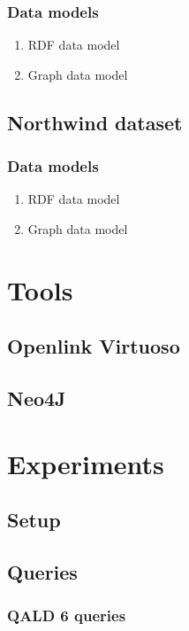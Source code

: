 \documentclass{sig-alternate-05-2015}
\begin{document}
\subsubsection{Data models}
\begin{enumerate}
    \item RDF data model
    \item Graph data model
\end{enumerate}

\subsection{Northwind dataset}
\subsubsection{Data models}
\begin{enumerate}
    \item RDF data model
    \item Graph data model
\end{enumerate}


\section{Tools}
\subsection{Openlink Virtuoso}
\subsection{Neo4J}



\section{Experiments}
\subsection{Setup}
\subsection{Queries}
\subsubsection{QALD 6 queries}
\end{document}
